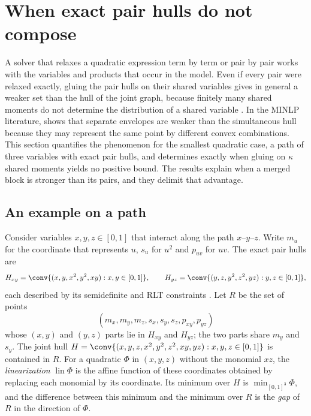 \section{When exact pair hulls do not compose}\label{sec:composition}

A solver that relaxes a quadratic expression term by term or pair by pair
works with the variables and products that occur in the model. Even if
every pair were relaxed exactly, gluing the pair hulls on their shared
variables gives in general a weaker set than the hull of the joint graph,
because finitely many shared moments do not determine the distribution of a
shared variable \citep{Lasserre2006,NieDemmel2009,FantuzziFuentes2025}. In
the MINLP literature, \citet[Example~3.8]{Tawarmalani2010} shows that
separate envelopes are weaker than the simultaneous hull because they may
represent the same point by different convex combinations. This section
quantifies the phenomenon for the smallest quadratic case, a path of three
variables with exact pair hulls, and determines exactly when gluing on
$\kappa$ shared moments yields no positive bound. The results explain when
a merged block is stronger than its pairs, and they delimit that advantage.

\subsection{An example on a path}\label{sec:path-example}

Consider variables $x,y,z\in[0,1]$ that interact along the path
$x$--$y$--$z$. Write $m_u$ for the coordinate that represents $u$, $s_u$
for $u^2$ and $p_{uv}$ for $uv$. The exact pair hulls are
\[
H_{xy}=\conv\{(x,y,x^2,y^2,xy):x,y\in[0,1]\},\qquad
H_{yz}=\conv\{(y,z,y^2,z^2,yz):y,z\in[0,1]\},
\]
each described by its semidefinite and RLT constraints
\citep{AnstreicherBurer2010}. Let $R$ be the set of points
\[
(m_x,m_y,m_z,s_x,s_y,s_z,p_{xy},p_{yz})
\]
whose $(x,y)$ and $(y,z)$ parts lie in $H_{xy}$ and $H_{yz}$; the two parts
share $m_y$ and $s_y$. The
joint hull $H=\conv\{(x,y,z,x^2,y^2,z^2,xy,yz):x,y,z\in[0,1]\}$ is
contained in $R$. For a quadratic $\Phi$ in $(x,y,z)$ without the monomial
$xz$, the \emph{linearization} $\operatorname{lin}\Phi$ is the affine
function of these coordinates obtained by replacing each monomial by its
coordinate. Its minimum over $H$ is $\min_{[0,1]^3}\Phi$, and the
difference between this minimum and the minimum over $R$ is the
\emph{gap} of $R$ in the direction of $\Phi$.

